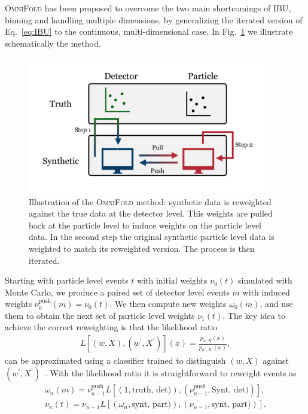 \textsc{OmniFold} has been proposed to overcome the two main shortcomings of IBU, binning and handling multiple dimensions, by generalizing the iterated version of Eq.~\ref{eq:IBU} to the continuous, multi-dimensional case. In Fig.~\ref{fig:omnifold} we illustrate schematically the method.
%
\begin{figure}[t]
\centering
\includegraphics[page = 1, width=0.95\textwidth]{./figures/omnifold}
\caption{Illustration of the \textsc{OmniFold} method: synthetic data is reweighted against the true data at the detector level. This weights are pulled back at the particle level to induce weights on the particle level data. In the second step the original synthetic particle level data is weighted to match its reweighted version. The process is then iterated.}
\label{fig:omnifold}
\end{figure}
%
Starting with particle level events $t$ with initial weights $\nu_0(t)$ simulated with Monte Carlo, we produce a paired set of detector level events $m$ with induced weights $\nu_0^{\text{push}}(m) = \nu_0(t)$.
We then compute new weights $\omega_0(m)$, and use them to obtain the next set of particle level weights $\nu_1(t)$. The key idea to achieve the correct reweighting is that the likelihood ratio
%
\begin{align}
L \left[ (w, X), (w^{'}, X^{'}) \right](x) = \frac{p_{w, X}(x)}{p_{w^{'}, X^{'}}(x)},
\end{align}
%
can be approximated using a classifier trained to distinguish $(w, X)$ against $(w^{'}, X^{'})$~\cite{Andreassen:2019nnm, brehmer1, brehmer2, mining, cranmer2016approximating}.
With the likelihood ratio it is straightforward to reweight events as
\begin{align}
\omega_n(m) = \nu_{n-1}^{\text{push}} L \left[ (1, \text{truth, det)}), (\nu_{n-1}^{\text{push}}, \text{Synt, det)})\right],\\
\nu_n(t) = \nu_{n-1} L \left[ (\omega_n, \text{synt, part)}), (\nu_{n-1}, \text{synt, part)})\right].
\end{align}
